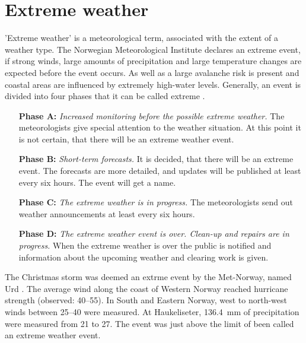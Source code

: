 \section{Extreme weather}
'Extreme weather' is a meteorological term, associated with the extent of a weather type. The Norwegian Meteorological Institute declares an extreme event, if strong winds, large amounts of precipitation and large temperature changes are expected before the event occurs. As well as a large avalanche risk is present and coastal areas are influenced by extremely high-water levels. 
Generally, an event is divided into four phases that it can be called extreme \citep{pedersen_hva_2013}. 
\begin{itemize}
	\setlength\itemsep{-.85em}
	\item[\textbf{Phase A:}] \textit{Increased monitoring before the possible extreme weather.} The meteorologists give special attention to the weather situation. At this point it is not certain, that there will be an extreme weather event.
	\item[\textbf{Phase B:}] \textit{Short-term forecasts.} It is decided, that there will be an extreme event. The forecasts are more detailed, and updates will be published at least every six hours. The event will get a name.
	\item[\textbf{Phase C:}] \textit{The extreme weather is in progress.} The meteorologists send out weather announcements at least every six hours.
	\item[\textbf{Phase D:}] \textit{The extreme weather event is over. Clean-up and repairs are in progress.} When the extreme weather is over the public is notified and information about the upcoming weather and clearing work is given.
\end{itemize}
The Christmas storm was deemed an extrme event by the Met-Norway, named Urd
\citep{olsen_ekstremvaerrapport._2017}. 
The average wind along the coast of Western Norway reached hurricane strength (observed: \SIrange{40}{55}{\mPs}). In South and Eastern Norway, west to north-west winds between \SIrange{25}{40}{\mPs} were measured.
At Haukeliseter, \SI{136.4}{\milli\metre} of precipitation were measured from \num{21} to \SI{27}{\dec}.
The event was just above the limit of been called an extreme weather event.



